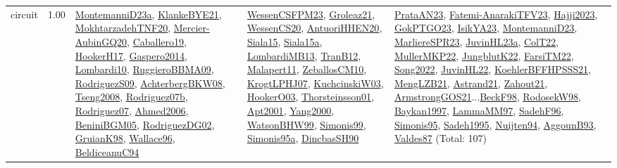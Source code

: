 {\begin{longtable}{p{3cm}r>{\raggedright\arraybackslash}p{6cm}>{\raggedright\arraybackslash}p{6cm}>{\raggedright\arraybackslash}p{8cm}}
\index{circuit}\index{Constraints!circuit}circuit &  1.00 & \hyperref[detail:MontemanniD23a]{MontemanniD23a}, \hyperref[detail:KlankeBYE21]{KlankeBYE21}, \hyperref[detail:MokhtarzadehTNF20]{MokhtarzadehTNF20}, \hyperref[detail:Mercier-AubinGQ20]{Mercier-AubinGQ20}, \hyperref[detail:Caballero19]{Caballero19}, \hyperref[detail:HookerH17]{HookerH17}, \hyperref[detail:Gaspero2014]{Gaspero2014}, \hyperref[detail:Lombardi10]{Lombardi10}, \hyperref[detail:RuggieroBBMA09]{RuggieroBBMA09}, \hyperref[detail:RodriguezS09]{RodriguezS09}, \hyperref[detail:AchterbergBKW08]{AchterbergBKW08}, \hyperref[detail:Tseng2008]{Tseng2008}, \hyperref[detail:Rodriguez07b]{Rodriguez07b}, \hyperref[detail:Rodriguez07]{Rodriguez07}, \hyperref[detail:Ahmed2006]{Ahmed2006}, \hyperref[detail:BeniniBGM05]{BeniniBGM05}, \hyperref[detail:RodriguezDG02]{RodriguezDG02}, \hyperref[detail:GruianK98]{GruianK98}, \hyperref[detail:Wallace96]{Wallace96}, \hyperref[detail:BeldiceanuC94]{BeldiceanuC94} & \hyperref[detail:WessenCSFPM23]{WessenCSFPM23}, \hyperref[detail:Groleaz21]{Groleaz21}, \hyperref[detail:WessenCS20]{WessenCS20}, \hyperref[detail:AntuoriHHEN20]{AntuoriHHEN20}, \hyperref[detail:Siala15]{Siala15}, \hyperref[detail:Siala15a]{Siala15a}, \hyperref[detail:LombardiMB13]{LombardiMB13}, \hyperref[detail:TranB12]{TranB12}, \hyperref[detail:Malapert11]{Malapert11}, \hyperref[detail:ZeballosCM10]{ZeballosCM10}, \hyperref[detail:KrogtLPHJ07]{KrogtLPHJ07}, \hyperref[detail:KuchcinskiW03]{KuchcinskiW03}, \hyperref[detail:HookerO03]{HookerO03}, \hyperref[detail:Thorsteinsson01]{Thorsteinsson01}, \hyperref[detail:Apt2001]{Apt2001}, \hyperref[detail:Yang2000]{Yang2000}, \hyperref[detail:WatsonBHW99]{WatsonBHW99}, \hyperref[detail:Simonis99]{Simonis99}, \hyperref[detail:Simonis95a]{Simonis95a}, \hyperref[detail:DincbasSH90]{DincbasSH90} & \hyperref[detail:PrataAN23]{PrataAN23}, \hyperref[detail:Fatemi-AnarakiTFV23]{Fatemi-AnarakiTFV23}, \hyperref[detail:Hajji2023]{Hajji2023}, \hyperref[detail:GokPTGO23]{GokPTGO23}, \hyperref[detail:IsikYA23]{IsikYA23}, \hyperref[detail:MontemanniD23]{MontemanniD23}, \hyperref[detail:MarliereSPR23]{MarliereSPR23}, \hyperref[detail:JuvinHL23a]{JuvinHL23a}, \hyperref[detail:ColT22]{ColT22}, \hyperref[detail:MullerMKP22]{MullerMKP22}, \hyperref[detail:JungblutK22]{JungblutK22}, \hyperref[detail:FarsiTM22]{FarsiTM22}, \hyperref[detail:Song2022]{Song2022}, \hyperref[detail:JuvinHL22]{JuvinHL22}, \hyperref[detail:KoehlerBFFHPSSS21]{KoehlerBFFHPSSS21}, \hyperref[detail:MengLZB21]{MengLZB21}, \hyperref[detail:Astrand21]{Astrand21}, \hyperref[detail:Zahout21]{Zahout21}, \hyperref[detail:ArmstrongGOS21]{ArmstrongGOS21}...\hyperref[detail:BeckF98]{BeckF98}, \hyperref[detail:RodosekW98]{RodosekW98}, \hyperref[detail:Baykan1997]{Baykan1997}, \hyperref[detail:LammaMM97]{LammaMM97}, \hyperref[detail:SadehF96]{SadehF96}, \hyperref[detail:Simonis95]{Simonis95}, \hyperref[detail:Sadeh1995]{Sadeh1995}, \hyperref[detail:Nuijten94]{Nuijten94}, \hyperref[detail:AggounB93]{AggounB93}, \hyperref[detail:Valdes87]{Valdes87} (Total: 107)\\

\end{longtable}}
